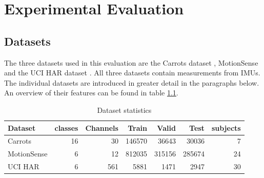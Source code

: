 \documentclass[11pt,titlepage,oneside,openany]{book}
\renewcommand{\algorithmiccomment}[1]{\ensuremath{\rhd} \textit{#1}}
\def\MYCALL#1#2{{\small\textsc{#1}}(\textup{#2})}
\def\MYNOT{\textbf{ not }}
\def\MYBREAK{\textbf{break }}
\def\MYNIL{\textsc{Nil}}
\def\ONT{{\mathcal O}} %
\def\ALI{{\mathcal A}} %
\begin{document}

\chapter{Experimental Evaluation}
\label{cha:exp}

\section{Datasets}
\label{sec:data}
The three datasets used in this evaluation are the Carrots dataset \cite{kruger_recognising_2011}, MotionSense \cite{malekzadeh_mobile_2019} and the UCI HAR dataset  \cite{anguita_public_2013}. All three datasets contain measurements from IMUs. The individual datasets are introduced in greater detail in the paragraphs below. An overview of their features can be found in table \ref{tab:sets}.

\begin{table}
	\centering
	\begin{tabularx}{.95\textwidth}{lrrrrrr}
		\toprule
		Dataset & classes & Channels & Train & Valid & Test & subjects \\
		\midrule
		Carrots & 16 & 30 & 146570 & 36643 & 30036 & 7 \\
		MotionSense & 6 & 12 & 812035 & 315156 & 285674 & 24 \\
		UCI HAR & 6 & 561 & 5881 & 1471 & 2947 & 30 \\
		\bottomrule
	\end{tabularx}
	\caption[Dataset statistics]{\label{tab:sets} Dataset statistics}
\end{table}
\end{document}
